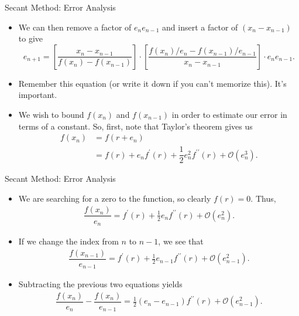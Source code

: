 \documentclass[9pt, serif]{beamer}
\newcommand{\bi}{\begin{itemize}}
\newcommand{\ei}{\end{itemize}}
\begin{document}
\begin{frame}{\hspace{50mm}Secant Method: Error Analysis}
	\bi
		\item We can then remove a factor of $e_ne_{n-1}$ and insert a factor of $(x_n-x_{n-1})$ to give
			\begin{equation}\label{factor}
				e_{n+1}=\left[\frac{x_n-x_{n-1}}{f(x_n)-f(x_{n-1})}\right]\cdot\left[\frac{f(x_n)/e_n-f(x_{n-1})/e_{n-1}}{x_n-x_{n-1}}\right]\cdot e_ne_{n-1}.
			\end{equation}
		\pause
		\item Remember this equation (or write it down if you can't memorize this). It's important. 
		\pause
		\item We wish to bound $f(x_n)$ and $f(x_{n-1})$ in order to estimate our error in terms of a constant. So, first, note that Taylor's theorem gives us
			\begin{align*}
				f(x_n)&=f(r+e_n)\\
				&=f(r)+e_nf^\prime(r)+\dfrac{1}{2}e^2_nf^{\prime\prime}(r)+\mathcal{O}(e^3_n).
			\end{align*}
	\ei
\end{frame}

\begin{frame}{\hspace{50mm}Secant Method: Error Analysis}
	\bi
		\item We are searching for a zero to the function, so clearly $f(r)=0$. Thus,
			\begin{align*}
				\dfrac{f(x_n)}{e_{n}}=f^\prime(r)+\frac{1}{2}e_nf^{\prime\prime}(r)+\mathcal{O}(e^2_n).
			\end{align*}
		\pause
		\item If we change the index from $n$ to $n-1$, we see that
			\begin{align*}
				\dfrac{f(x_{n-1})}{e_{n-1}}=f^\prime(r)+\frac{1}{2}e_{n-1}f^{\prime\prime}(r)+\mathcal{O}(e^2_{n-1}).
			\end{align*}
		\pause
		\item Subtracting the previous two equations yields 
			\begin{align*}
				\dfrac{f(x_n)}{e_n}-\dfrac{f(x_n)}{e_{n-1}}=\frac{1}{2}(e_n-e_{n-1})f^{\prime\prime}(r)+\mathcal{O}(e^2_{n-1}).
			\end{align*}
	\ei
\end{frame}
\end{document}
